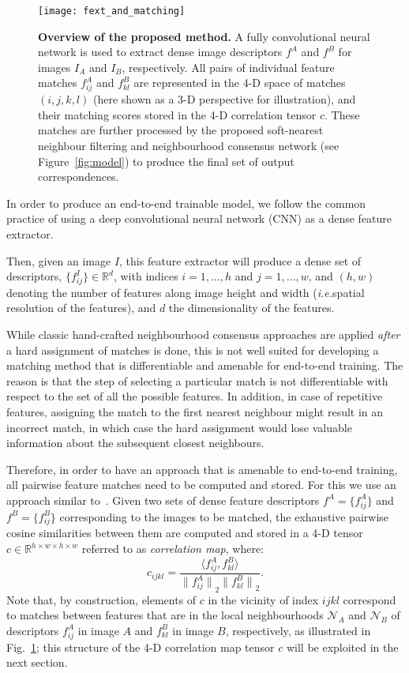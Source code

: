 \documentclass{article}
\begin{document}
\begin{figure}[t]
  \centering
    \texttt{[image: fext\_and\_matching]}
    \caption{\small \textbf{Overview of the proposed method.} A fully convolutional neural network is used to extract dense image descriptors $f^A$ and $f^B$ for images $I_A$ and $I_B$, respectively. All pairs of individual feature matches $f^A_{ij}$ and $f^B_{kl}$ are represented in the 4-D space of matches $(i,j,k,l)$ (here shown as a 3-D perspective for illustration), and their matching scores stored in the 4-D correlation tensor $c$. These matches are further processed by the proposed soft-nearest neighbour filtering and neighbourhood consensus network (see Figure~\ref{fig:model}) to produce the final set of output correspondences.\label{fig:fext_and_matching}}
\end{figure}


In order to produce an end-to-end trainable model, we follow the common practice of using a deep convolutional neural network (CNN)
as a dense feature extractor.

Then, given an image $I$, this feature extractor will produce a dense set of descriptors, $\{f^I_{ij}\} \in \mathbb{R}^d$, 
with indices $i=1,\dots,h$ and $j=1,\dots,w$, and $(h,w)$ denoting the number of features along image height and width 
(\emph{i.e.}\the spatial resolution of the features), and $d$ the dimensionality of the features.

While classic hand-crafted neighbourhood consensus approaches are applied \emph{after} a hard assignment of matches is done, this is not well suited for developing a matching method that is differentiable and amenable for end-to-end training. The reason is that the step of selecting a particular match 
is not differentiable with respect to the set of all the possible features. In addition, in case of repetitive features, assigning the match to the first nearest neighbour might result in an incorrect match, in which case the hard assignment would lose valuable information about the subsequent closest neighbours.


Therefore, in order to have an approach that is amenable to end-to-end training, all pairwise feature matches need to be computed and stored. For this we use an approach similar to~\cite{Rocco17}. Given two sets of dense feature descriptors $f^A=\{f^A_{ij}\}$ and $f^B=\{f^B_{ij}\}$ corresponding to the images to be matched, the exhaustive pairwise cosine similarities between them are computed and stored in a 4-D tensor $c\in \mathbb{R}^{h\times w\times h\times w}$ referred to as \emph{correlation map}, where:
\begin{equation}
    c_{ijkl}=\frac{\langle f^A_{ij}, f^B_{kl}\rangle}{{\|f^A_{ij}\|}_2 {\|f^B_{kl}\|}_2}.
    \label{eq:corrmap}
\end{equation}
Note that, by construction, elements of $c$ in the vicinity of index $ijkl$ correspond to matches between features that are in the local neighbourhoods $\mathcal{N}_A$ and $\mathcal{N}_B$ of descriptors $f^A_{ij}$ in image $A$ and $f^B_{kl}$ in image $B$, respectively, as illustrated in Fig.~\ref{fig:fext_and_matching}; this structure of the 4-D correlation map tensor $c$ will be exploited in the next section.
\end{document}
